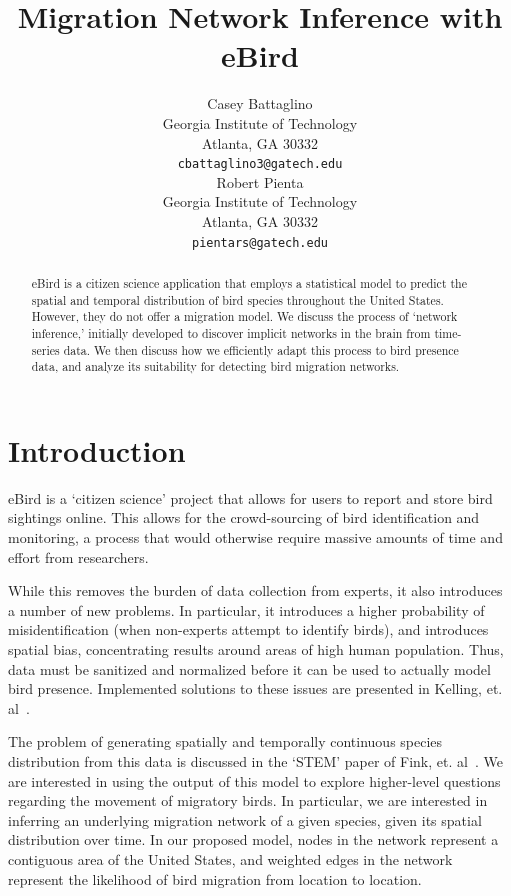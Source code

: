\documentclass{article} %
\title{Migration Network Inference with eBird}
\author{
Casey Battaglino \\
Georgia Institute of Technology\\
Atlanta, GA 30332 \\
\texttt{cbattaglino3@gatech.edu} \\
\And
Robert Pienta \\
Georgia Institute of Technology \\
Atlanta, GA 30332 \\
\texttt{pientars@gatech.edu} \\
}
\begin{document}
\maketitle

\begin{abstract}
eBird is a citizen science application that employs a statistical model to predict the spatial and temporal distribution of bird species throughout the United States. However, they do not offer a migration model. We discuss the process of `network inference,' initially developed to discover implicit networks in the brain from time-series data. We then discuss how we efficiently adapt this process to bird presence data, and analyze its suitability for detecting bird migration networks. 
\end{abstract}

\section{Introduction}
eBird\cite{DBLP:conf/iaai/KellingGFLWYDG12} is a `citizen science' project that allows for users to report and store bird sightings online. This allows for the crowd-sourcing of bird identification and monitoring, a process that would otherwise require massive amounts of time and effort from researchers. 

While this removes the burden of data collection from experts, it also introduces a number of new problems. In particular, it introduces a higher probability of misidentification (when non-experts attempt to identify birds), and introduces spatial bias, concentrating results around areas of high human population. Thus, data must be sanitized and normalized before it can be used to actually model bird presence. Implemented solutions to these issues are presented in Kelling, et. al~\cite{DBLP:conf/iaai/KellingGFLWYDG12}.

The problem of generating spatially and temporally continuous species distribution from this data is discussed in the `STEM' paper of Fink, et. al~\cite{stem}. We are interested in using the output of this model to explore higher-level questions regarding the movement of migratory birds. In particular, we are interested in inferring an underlying migration network of a given species, given its spatial distribution over time. In our proposed model, nodes in the network represent a contiguous area of the United States, and weighted edges in the network represent the likelihood of bird migration from location to location. 
\end{document}
